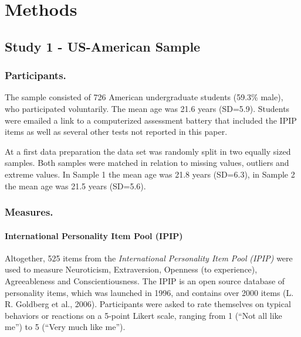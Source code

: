 \documentclass[man]{apa6}
\theoremstyle{definition}
\theoremstyle{definition}
\theoremstyle{definition}
\theoremstyle{remark}
\begin{document}
\hypertarget{methods}{%
\section{Methods}\label{methods}}

\hypertarget{study-1---us-american-sample}{%
\subsection{Study 1 - US-American
Sample}\label{study-1---us-american-sample}}

\hypertarget{participants.}{%
\subsubsection{Participants.}\label{participants.}}

The sample consisted of 726 American undergraduate students (59.3\%
male), who participated voluntarily. The mean age was 21.6 years
(SD=5.9). Students were emailed a link to a computerized assessment
battery that included the IPIP items as well as several other tests not
reported in this paper.

At a first data preparation the data set was randomly split in two
equally sized samples. Both samples were matched in relation to missing
values, outliers and extreme values. In Sample 1 the mean age was 21.8
years (SD=6.3), in Sample 2 the mean age was 21.5 years (SD=5.6).

\hypertarget{measures.}{%
\subsubsection{Measures.}\label{measures.}}

\hypertarget{international-personality-item-pool-ipip}{%
\paragraph{International Personality Item Pool
(IPIP)}\label{international-personality-item-pool-ipip}}

Altogether, 525 items from the \emph{International Personality Item
Pool} \emph{(IPIP)} were used to measure Neuroticism, Extraversion,
Openness (to experience), Agreeableness and Conscientiousness. The IPIP
is an open source database of personality items, which was launched in
1996, and contains over 2000 items (L. R. Goldberg et al., 2006).
Participants were asked to rate themselves on typical behaviors or
reactions on a 5-point Likert scale, ranging from 1 (\enquote{Not all
like me}) to 5 (\enquote{Very much like me}).
\end{document}

